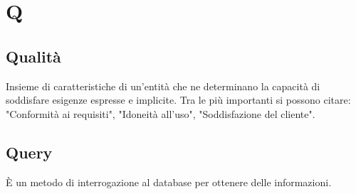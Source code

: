 \section*{Q}

\subsection{Qualità}
Insieme di caratteristiche di un'entità che ne determinano la capacità di soddisfare esigenze espresse e implicite. Tra le più importanti si possono citare: "Conformità ai requisiti", "Idoneità all'uso", "Soddisfazione del cliente".

\subsection{Query}
È un metodo di interrogazione al database per ottenere delle informazioni.